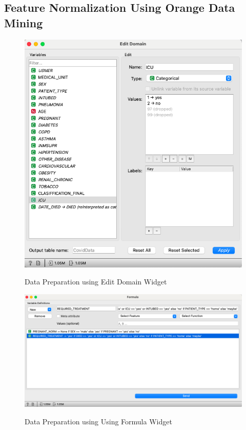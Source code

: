 \subsection{Feature Normalization Using Orange Data Mining}

\begin{figure}[H]%
    \caption{Data Preparation using Edit Domain Widget}%
    \label{fig:data_preparation_edit_dm}%
    \centering
    {\includegraphics[width=\textwidth]{img/appendix/data_preparation_edit_domain.png} }
\end{figure}

\begin{figure}[H]%
    \caption{Data Preparation using Using Formula Widget}%
    \label{fig:data_preparation_using_formula}%
    \centering
    {\includegraphics[width=\textwidth]{img/appendix/data_preparation_using_formula.png} }
\end{figure}

